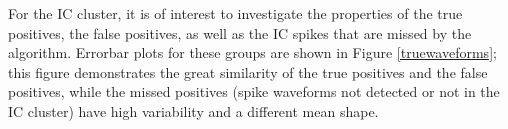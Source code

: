

For the IC cluster, it is of interest to investigate the properties of the true positives, the false positives, as well as the IC spikes that are missed by the algorithm.  Errorbar plots for these groups are shown in Figure \ref{truewaveforms}; this figure demonstrates the great similarity of the true positives and the false positives, while the missed positives (spike waveforms not detected or not in the IC cluster) have high variability and a different mean shape. 
 
